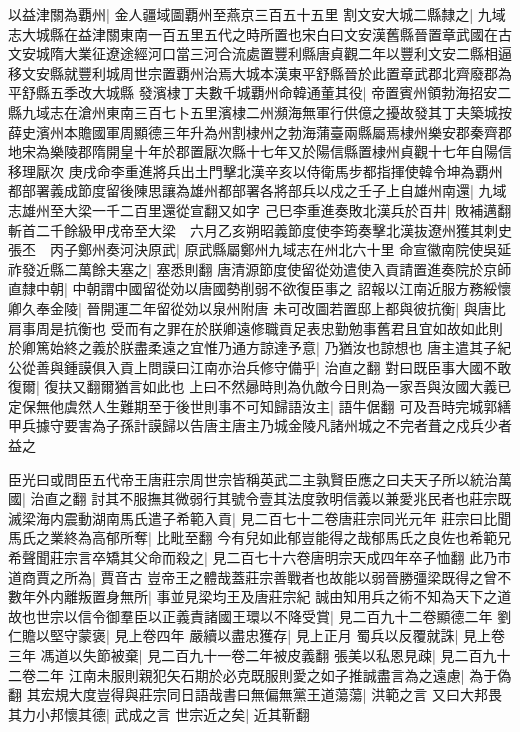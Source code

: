 以益津關為覇州|{
	金人疆域圖覇州至燕京三百五十五里}
割文安大城二縣隸之|{
	九域志大城縣在益津關東南一百五里五代之時所置也宋白曰文安漢舊縣晉置章武國在古文安城隋大業征遼途經河口當三河合流處置豐利縣唐貞觀二年以豐利文安二縣相逼移文安縣就豐利城周世宗置覇州治焉大城本漢東平舒縣晉於此置章武郡北齊廢郡為平舒縣五季改大城縣}
發濱棣丁夫數千城覇州命韓通董其役|{
	帝置賓州領勃海招安二縣九域志在滄州東南三百七卜五里濱棣二州瀕海無軍行供億之擾故發其丁夫築城按薛史濱州本贍國軍周顯德三年升為州割棣州之勃海蒲臺兩縣屬焉棣州樂安郡秦齊郡地宋為樂陵郡隋開皇十年於郡置厭次縣十七年又於陽信縣置棣州貞觀十七年自陽信移理厭次}
庚戌命李重進將兵出土門擊北漢辛亥以侍衛馬步都指揮使韓令坤為覇州都部署義成節度留後陳思讓為雄州都部署各將部兵以戍之壬子上自雄州南還|{
	九域志雄州至大梁一千二百里還從宣翻又如字}
己巳李重進奏敗北漢兵於百井|{
	敗補邁翻}
斬首二千餘級甲戌帝至大梁　六月乙亥朔昭義節度使李筠奏擊北漢抜遼州獲其刺史張丕　丙子鄭州奏河決原武|{
	原武縣屬鄭州九域志在州北六十里}
命宣徽南院使吳延祚發近縣二萬餘夫塞之|{
	塞悉則翻}
唐清源節度使留從効遣使入貢請置進奏院於京師直隸中朝|{
	中朝謂中國留從効以唐國勢削弱不欲復臣事之}
詔報以江南近服方務綏懷卿久奉金陵|{
	晉開運二年留從効以泉州附唐}
未可改圖若置邸上都與彼抗衡|{
	與唐比肩事周是抗衡也}
受而有之罪在於朕卿遠修職貢足表忠勤勉事舊君且宜如故如此則於卿篤始終之義於朕盡柔遠之宜惟乃通方諒達予意|{
	乃猶汝也諒想也}
唐主遣其子紀公從善與鍾謨俱入貢上問謨曰江南亦治兵修守備乎|{
	治直之翻}
對曰既臣事大國不敢復爾|{
	復扶又翻爾猶言如此也}
上曰不然曏時則為仇敵今日則為一家吾與汝國大義已定保無他虞然人生難期至于後世則事不可知歸語汝主|{
	語牛倨翻}
可及吾時完城郭繕甲兵據守要害為子孫計謨歸以告唐主唐主乃城金陵凡諸州城之不完者葺之戍兵少者益之

臣光曰或問臣五代帝王唐莊宗周世宗皆稱英武二主孰賢臣應之曰夫天子所以統治萬國|{
	治直之翻}
討其不服撫其微弱行其號令壹其法度敦明信義以兼愛兆民者也莊宗既滅梁海内震動湖南馬氏遣子希範入貢|{
	見二百七十二卷唐莊宗同光元年}
莊宗曰比聞馬氏之業終為高郁所奪|{
	比毗至翻}
今有兒如此郁豈能得之哉郁馬氏之良佐也希範兄希聲聞莊宗言卒矯其父命而殺之|{
	見二百七十六卷唐明宗天成四年卒子恤翻}
此乃市道商賈之所為|{
	賈音古}
豈帝王之體哉蓋莊宗善戰者也故能以弱晉勝彊梁既得之曾不數年外内離叛置身無所|{
	事並見梁均王及唐莊宗紀}
誠由知用兵之術不知為天下之道故也世宗以信令御羣臣以正義責諸國王環以不降受賞|{
	見二百九十二卷顯德二年}
劉仁贍以堅守蒙褒|{
	見上卷四年}
嚴續以盡忠獲存|{
	見上正月}
蜀兵以反覆就誅|{
	見上卷三年}
馮道以失節被棄|{
	見二百九十一卷二年被皮義翻}
張美以私恩見疎|{
	見二百九十二卷二年}
江南未服則親犯矢石期於必克既服則愛之如子推誠盡言為之遠慮|{
	為于偽翻}
其宏規大度豈得與莊宗同日語哉書曰無偏無黨王道蕩蕩|{
	洪範之言}
又曰大邦畏其力小邦懷其德|{
	武成之言}
世宗近之矣|{
	近其靳翻}


